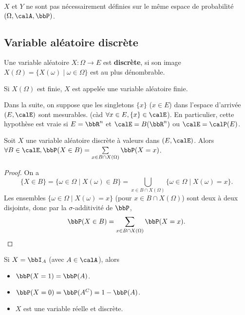 \begin{rqq}
    $X$ et $Y$ ne sont pas nécessairement définies sur le même espace de probabilité $(\Omega, \calA, \bbP)$.
\end{rqq}

\subsection{Variable aléatoire discrète}

\begin{deff}
    Une variable aléatoire $X: \Omega \to E$ est \textbf{discrète},
    si son image $X(\Omega) = \{ X(\omega) \mid \omega \in \Omega \}$ est au plus dénombrable.

    Si $X(\Omega)$ est finie, $X$ est appelée une variable aléatoire finie.
\end{deff}

\begin{rqq}[Hypothèse]
    Dans la suite,
    on suppose que les singletons $\{ x \}$ ($x \in E$) dans l'espace d'arrivée $(E, \calE)$ sont mesurables.
    (càd $\forall x \in E, \{ x \} \in \calE$).
    En particulier, cette hypothèse est vraie si $E = \bbR^n$ et $\calE = B(\bbR^n)$ ou $\calE = \calP(E)$.
\end{rqq}

\begin{prop}
    Soit $X$ une variable aléatoire discrète à valeurs dans $(E, \calE)$.
    Alors $\forall B \in \calE, \bbP(X \in B) = \sum\limits_{x \in B \cap X(\Omega)} \bbP(X = x)$.
\end{prop}

\begin{proof}
    On a
    \[ \{ X \in B \} = \{ \omega \in \Omega \mid X(\omega) \in B \} =
        \bigcup_{x \in B \cap X(\Omega)} \{ \omega \in \Omega \mid X(\omega) = x \}. \]
    Les ensembles $\{ \omega \in \Omega \mid X(\omega) = x \}$ (pour $x \in B \cap X(\Omega)$) sont deux à deux disjoints,
    donc par la $\sigma$-additivité de $\bbP$,
    \[ \bbP(X \in B) = \sum_{x \in B \cap X(\Omega)} \bbP(X = x). \qedhere \]
\end{proof}

\begin{exem}
    Si $X = \bbI_A$ (avec $A \in \calA$),
    alors
    \begin{itemize}
        \item $\bbP(X = 1) = \bbP(A)$.
        \item $\bbP(X = 0) = \bbP(A^C) = 1 - \bbP(A)$.
        \item $X$ est une variable réelle et discrète.
    \end{itemize}
\end{exem}

